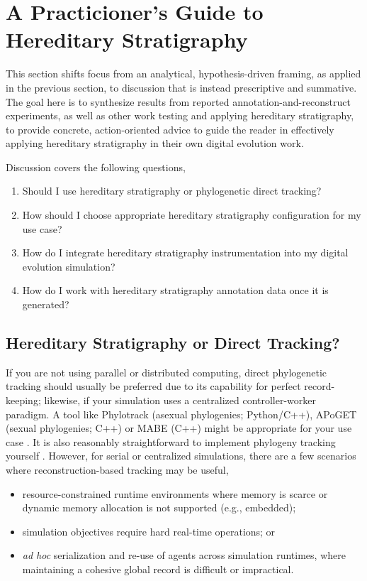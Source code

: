 \section{A Practicioner's Guide to Hereditary Stratigraphy} \label{sec:synthesis}

This section shifts focus from an analytical, hypothesis-driven framing, as applied in the previous section, to discussion that is instead prescriptive and summative.
The goal here is to synthesize results from reported annotation-and-reconstruct experiments, as well as other work testing and applying hereditary stratigraphy, to provide concrete, action-oriented advice to guide the reader in effectively applying hereditary stratigraphy in their own digital evolution work.

Discussion covers the following questions,
\begin{enumerate}
\item Should I use hereditary stratigraphy or phylogenetic direct tracking?
\item How should I choose appropriate hereditary stratigraphy configuration for my use case?
\item How do I integrate hereditary stratigraphy instrumentation into my digital evolution simulation?
\item How do I work with hereditary stratigraphy annotation data once it is generated?
\end{enumerate}

\subsection{Hereditary Stratigraphy or Direct Tracking?}

If you are not using parallel or distributed computing, direct phylogenetic tracking should usually be preferred due to its capability for perfect record-keeping; likewise, if your simulation uses a centralized controller-worker paradigm.
A tool like Phylotrack (asexual phylogenies; Python/C++), APoGET (sexual phylogenies; C++) or MABE (C++) might be appropriate for your use case \citep{dolson2024phylotrackpy,bohm2017mabe,godin2019apoget}.
It is also reasonably straightforward to implement phylogeny tracking yourself \citep{moreno2024algorithms}.
However, for serial or centralized simulations, there are a few scenarios where reconstruction-based tracking may be useful,
\begin{itemize}
\item resource-constrained runtime environments where memory is scarce or dynamic memory allocation is not supported (e.g., embedded);
\item simulation objectives require hard real-time operations; or
\item \textit{ad hoc} serialization and re-use of agents across simulation runtimes, where maintaining a cohesive global record is difficult or impractical.
\end{itemize}

